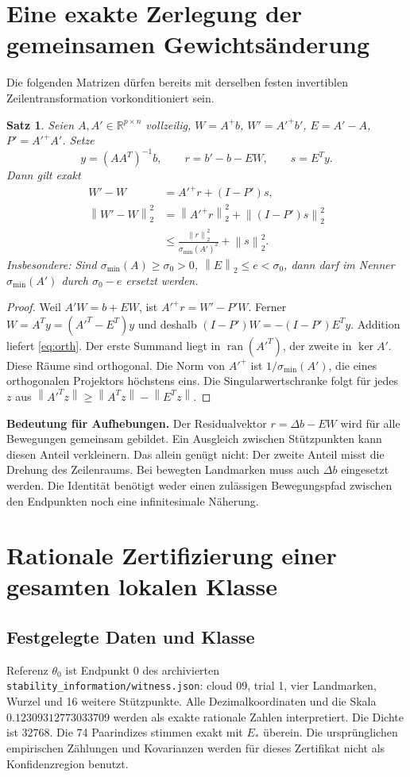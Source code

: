 \documentclass[11pt,a4paper]{article}
\newtheorem{theorem}{Satz}\newtheorem{lemma}{Lemma}\newtheorem{corollary}{Korollar}
\newcommand{\norm}[1]{\left\lVert#1\right\rVert}\newcommand{\abs}[1]{\left|#1\right|}
\newcommand{\smin}{\sigma_{\min}}\newcommand{\R}{\mathbb R}
\begin{document}
\section{Eine exakte Zerlegung der gemeinsamen Gewichtsänderung}
Die folgenden Matrizen dürfen bereits mit derselben festen invertiblen Zeilentransformation vorkonditioniert sein.
\begin{theorem}\label{thm:orth}
Seien $A,A'\in\R^{p\times n}$ vollzeilig, $W=A^+b$, $W'=A'^+b'$, $E=A'-A$, $P'=A'^+A'$. Setze
\[
 y=(AA^T)^{-1}b,\qquad r=b'-b-EW,\qquad s=E^Ty.
\]
Dann gilt exakt
\begin{align}\label{eq:orth}
 W'-W&=A'^+r+(I-P')s,\\
 \norm{W'-W}_2^2&=\norm{A'^+r}_2^2+\norm{(I-P')s}_2^2\\
 &\leq\frac{\norm r_2^2}{\smin(A')^2}+\norm s_2^2.\label{eq:bound}
\end{align}
Insbesondere: Sind $\smin(A)\geq\sigma_0>0$, $\norm E_2\leq e<\sigma_0$, dann darf im Nenner $\smin(A')$ durch $\sigma_0-e$ ersetzt werden.
\end{theorem}
\begin{proof}
Weil $A'W=b+EW$, ist $A'^+r=W'-P'W$. Ferner $W=A^Ty=(A'^T-E^T)y$ und deshalb $(I-P')W=-(I-P')E^Ty$. Addition liefert \eqref{eq:orth}. Der erste Summand liegt in $\operatorname{ran}(A'^T)$, der zweite in $\ker A'$. Diese Räume sind orthogonal. Die Norm von $A'^+$ ist $1/\smin(A')$, die eines orthogonalen Projektors höchstens eins. Die Singularwertschranke folgt für jedes $z$ aus $\norm{A'^Tz}\geq\norm{A^Tz}-\norm{E^Tz}$.
\end{proof}

\textbf{Bedeutung für Aufhebungen.} Der Residualvektor $r=\Delta b-EW$ wird für alle Bewegungen gemeinsam gebildet. Ein Ausgleich zwischen Stützpunkten kann diesen Anteil verkleinern. Das allein genügt nicht: Der zweite Anteil misst die Drehung des Zeilenraums. Bei bewegten Landmarken muss auch $\Delta b$ eingesetzt werden. Die Identität benötigt weder einen zulässigen Bewegungspfad zwischen den Endpunkten noch eine infinitesimale Näherung.

\section{Rationale Zertifizierung einer gesamten lokalen Klasse}
\subsection{Festgelegte Daten und Klasse}
Referenz $\theta_0$ ist Endpunkt 0 des archivierten \texttt{stability\_information/witness.json}: cloud 09, trial 1, vier Landmarken, Wurzel und 16 weitere Stützpunkte. Alle Dezimalkoordinaten und die Skala $0.12309312773033709$ werden als exakte rationale Zahlen interpretiert. Die Dichte ist $32768$. Die 74 Paarindizes stimmen exakt mit $E_*$ überein. Die ursprünglichen empirischen Zählungen und Kovarianzen werden für dieses Zertifikat nicht als Konfidenzregion benutzt.
\end{document}
